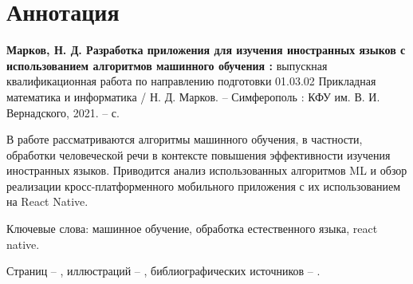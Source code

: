 \section*{Аннотация}
\textbf{Марков, Н. Д. Разработка приложения для изучения иностранных языков с использованием алгоритмов машинного обучения :} выпускная квалификационная работа по направлению подготовки 01.03.02 Прикладная математика и информатика / Н. Д. Марков. -- Симферополь : КФУ им. В. И. Вернадского, 2021. -- \pageref{LastPage}с.

В работе рассматриваются алгоритмы машинного обучения, в частности, обработки человеческой речи в контексте повышения эффективности изучения иностранных языков. Приводится анализ использованных алгоритмов ML и обзор реализации кросс-платформенного мобильного приложения с их использованием на React Native.

Ключевые слова: машинное обучение, обработка естественного языка, react native.

Страниц -- \pageref{LastPage}, иллюстраций -- \totalfigures{}, библиографических источников -- .
